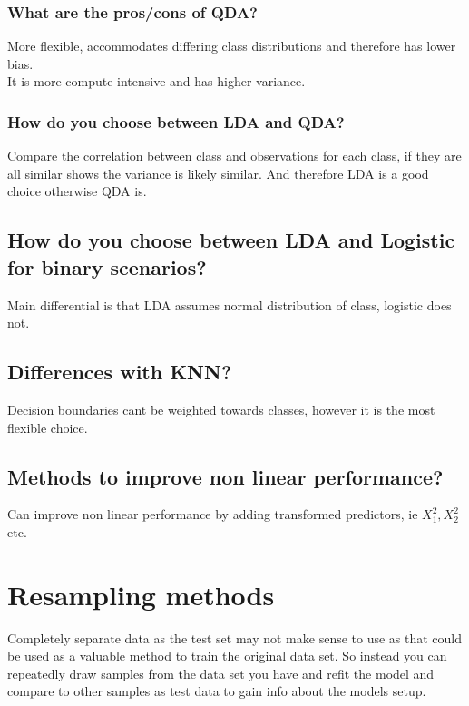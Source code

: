 \documentclass[11pt]{scrartcl} %
\begin{document}
\subsubsection{What are the pros/cons of QDA?}

More flexible, accommodates differing class distributions and therefore has lower bias.\\

It is more compute intensive and has higher variance.

\subsubsection{How do you choose between LDA and QDA?}

Compare the correlation between class and observations for each class, if they are all similar shows
the variance is likely similar. And therefore LDA is a good choice otherwise QDA is.

\subsection{How do you choose between LDA and Logistic for binary scenarios?}

Main differential is that LDA assumes normal distribution of class, logistic does not.

\subsection{Differences with KNN?}

Decision boundaries cant be weighted towards classes, however it is the most flexible choice.

\subsection{Methods to improve non linear performance?}

Can improve non linear performance by adding transformed predictors, ie \(X_1^2,X_2^2\) etc.

\section{Resampling methods}

Completely separate data as the test set may not make sense to use as that could be used as
a valuable method to train the original data set. So instead you can repeatedly draw samples
from the data set you have and refit the model and compare to other samples as test data to gain
info about the models setup.\\
\end{document}
